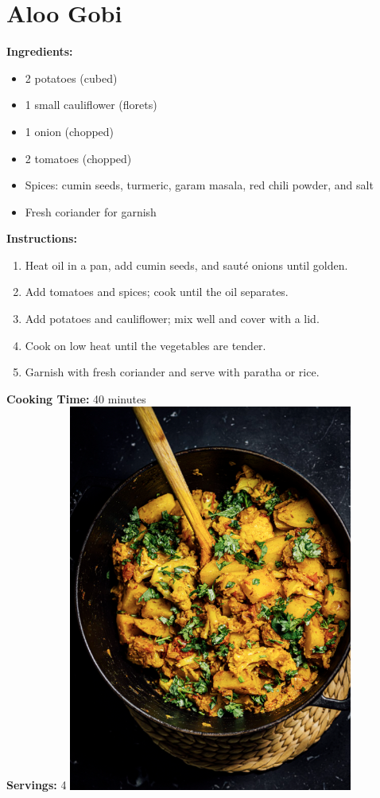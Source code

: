 \documentclass[12pt]{article}
\begin{document}
\section{Aloo Gobi}
\label{sec:aloo_gobi}
\textbf{Ingredients:}
\begin{itemize}
    \item 2 potatoes (cubed)
    \item 1 small cauliflower (florets)
    \item 1 onion (chopped)
    \item 2 tomatoes (chopped)
    \item Spices: cumin seeds, turmeric, garam masala, red chili powder, and salt
    \item Fresh coriander for garnish
\end{itemize}

\textbf{Instructions:}
\begin{enumerate}
    \item Heat oil in a pan, add cumin seeds, and sauté onions until golden.
    \item Add tomatoes and spices; cook until the oil separates.
    \item Add potatoes and cauliflower; mix well and cover with a lid.
    \item Cook on low heat until the vegetables are tender.
    \item Garnish with fresh coriander and serve with paratha or rice.
\end{enumerate}

\textbf{Cooking Time:} 40 minutes \\
\textbf{Servings:} 4
\includegraphics[width=0.7\textwidth]{aloo_gobi.png} 
\newpage
\end{document}
